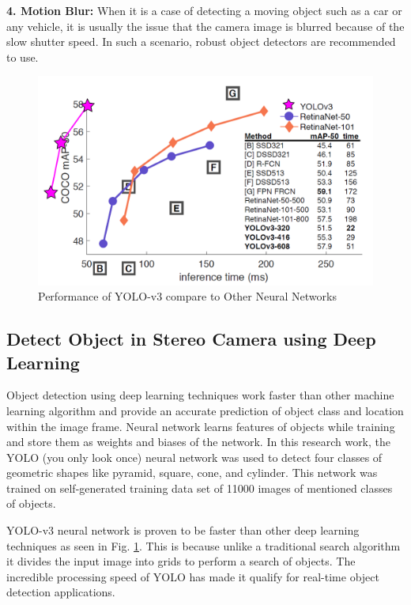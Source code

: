 \textbf{4. Motion Blur:}
When it is a case of detecting a moving object such as a car or any vehicle, it is usually the issue that the camera image is blurred because of the slow shutter speed. In such a scenario, robust object detectors are recommended to use.


\begin{figure}
    \centering
    \includegraphics[scale= 0.35]{Images/yolov3time.png}
    \caption{Performance of YOLO-v3 compare to Other Neural Networks \cite{yolov3}}
    \label{yolov3time}
\end{figure}

\subsection{Detect Object in Stereo Camera using Deep Learning}
Object detection using deep learning techniques work faster than other machine learning algorithm and provide an accurate prediction of object class and location within the image frame. Neural network learns features of objects while training and store them as weights and biases of the network. In this research work, the YOLO (you only look once) neural network was used to detect four classes of geometric shapes like pyramid, square, cone, and cylinder. This network was trained on self-generated training data set of 11000 images of mentioned classes of objects.   

YOLO-v3 neural network is proven to be faster than other deep learning techniques as seen in Fig. \ref{yolov3time}. This is because unlike a traditional search algorithm it divides the input image into grids to perform a search of objects. The incredible processing speed of YOLO has made it qualify for real-time object detection applications.


